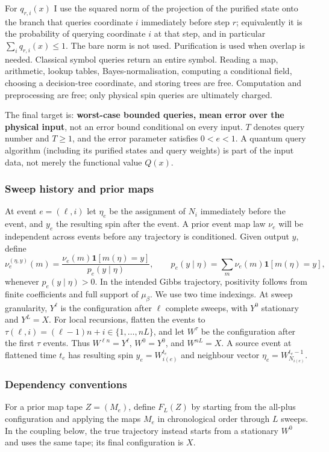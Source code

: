 \documentclass[11pt]{article}
\theoremstyle{definition}\newtheorem{definition}[theorem]{Definition}
\theoremstyle{remark}\newtheorem{remark}[theorem]{Remark}
\begin{document}
For \(q_{r,i}(x)\) I use the squared norm of the projection of the purified state onto the branch that queries coordinate \(i\) immediately before step \(r\); equivalently it is the probability of querying coordinate \(i\) at that step, and in particular \(\sum_iq_{r,i}(x)\le1\). The bare norm is not used. Purification is used when overlap is needed. Classical symbol queries return an entire symbol. Reading a map, arithmetic, lookup tables, Bayes-normalisation, computing a conditional field, choosing a decision-tree coordinate, and storing trees are free. Computation and preprocessing are free; only physical spin queries are ultimately charged.

The final target is: \textbf{worst-case bounded queries, mean error over the physical input}, not an error bound conditional on every input. \(T\) denotes query number and \(T\ge1\), and the error parameter satisfies \(0<e<1\). A quantum query algorithm (including its purified states and query weights) is part of the input data, not merely the functional value \(Q(x)\).

\subsubsection{Sweep history and prior maps}
At event \(e=(\ell,i)\) let \(\eta_e\) be the assignment of \(N_i\) immediately before the event, and \(y_e\) the resulting spin after the event. A prior event map law \(\nu_e\) will be independent across events before any trajectory is conditioned. Given output \(y\), define
\[
 \nu_e^{(\eta,y)}(m)=\frac{\nu_e(m)\mathbf 1[m(\eta)=y]}{p_e(y\mid\eta)},\qquad
 p_e(y\mid\eta)=\sum_m\nu_e(m)\mathbf 1[m(\eta)=y],
\]
whenever \(p_e(y\mid\eta)>0\). In the intended Gibbs trajectory, positivity follows from finite coefficients and full support of \(\mu_\beta\). We use two time indexings. At sweep granularity, \(Y^\ell\) is the configuration after \(\ell\) complete sweeps, with \(Y^0\) stationary and \(Y^L=X\). For local recursions, flatten the events to \(\tau(\ell,i)=(\ell-1)n+i\in\{1,\ldots,nL\}\), and let \(W^\tau\) be the configuration after the first \(\tau\) events. Thus \(W^{\ell n}=Y^\ell\), \(W^0=Y^0\), and \(W^{nL}=X\). A source event at flattened time \(t_e\) has resulting spin \(y_e=W^{t_e}_{i(e)}\) and neighbour vector \(\eta_e=W^{t_e-1}_{N_{i(e)}}\).

\subsubsection{Dependency conventions}
For a prior map tape \(Z=(M_e)\), define \(F_L(Z)\) by starting from the all-plus configuration and applying the maps \(M_e\) in chronological order through \(L\) sweeps. In the coupling below, the true trajectory instead starts from a stationary \(W^0\) and uses the same tape; its final configuration is \(X\).
\end{document}
